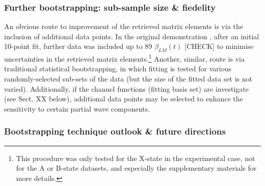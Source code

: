 









\subsubsection{Further bootstrapping: sub-sample size \& fiedelity}

An obvious route to improvement of the retrieved matrix elements is via the inclusion of additional data points. In the original demonstration \cite{marceau2017MolecularFrameReconstruction}, after an initial 10-point fit, further data was included up to 89 $\beta_{LM}(t)$ [CHECK] to minimise uncertainties in the retrieved matrix elements.\footnote{This procedure was only tested for the X-state in the experimental case, not for the A or B-state datasets, %
and especially the supplementary materials for more details.} Another, similar, route is via traditional statistical bootstrapping, in which fitting is tested for various randomly-selected sub-sets of the data (but the size of the fitted data set is not varied). Additionally, if the channel functions (fitting basis set) are investigate (see Sect. XX below), additional data points may be selected to enhance the sensitivity to certain partial wave components.




\subsubsection{Bootstrapping technique outlook \& future directions}

